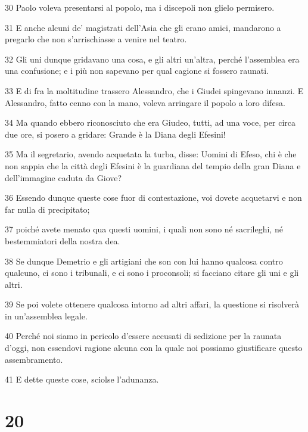 \par 30 Paolo voleva presentarsi al popolo, ma i discepoli non glielo permisero.
\par 31 E anche alcuni de' magistrati dell'Asia che gli erano amici, mandarono a pregarlo che non s'arrischiasse a venire nel teatro.
\par 32 Gli uni dunque gridavano una cosa, e gli altri un'altra, perché l'assemblea era una confusione; e i più non sapevano per qual cagione si fossero raunati.
\par 33 E di fra la moltitudine trassero Alessandro, che i Giudei spingevano innanzi. E Alessandro, fatto cenno con la mano, voleva arringare il popolo a loro difesa.
\par 34 Ma quando ebbero riconosciuto che era Giudeo, tutti, ad una voce, per circa due ore, si posero a gridare: Grande è la Diana degli Efesini!
\par 35 Ma il segretario, avendo acquetata la turba, disse: Uomini di Efeso, chi è che non sappia che la città degli Efesini è la guardiana del tempio della gran Diana e dell'immagine caduta da Giove?
\par 36 Essendo dunque queste cose fuor di contestazione, voi dovete acquetarvi e non far nulla di precipitato;
\par 37 poiché avete menato qua questi uomini, i quali non sono né sacrileghi, né bestemmiatori della nostra dea.
\par 38 Se dunque Demetrio e gli artigiani che son con lui hanno qualcosa contro qualcuno, ci sono i tribunali, e ci sono i proconsoli; si facciano citare gli uni e gli altri.
\par 39 Se poi volete ottenere qualcosa intorno ad altri affari, la questione si risolverà in un'assemblea legale.
\par 40 Perché noi siamo in pericolo d'essere accusati di sedizione per la raunata d'oggi, non essendovi ragione alcuna con la quale noi possiamo giustificare questo assembramento.
\par 41 E dette queste cose, sciolse l'adunanza.

\chapter{20}

